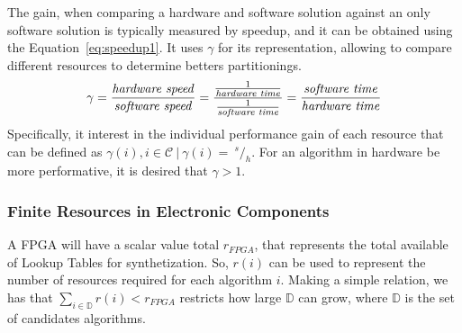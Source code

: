             
            The gain, when comparing a hardware and software solution against an only software solution is typically measured by speedup, and it can be obtained using the Equation~\ref{eq:speedup1}.
            It uses $ \gamma $ for its representation, allowing to compare different resources to determine betters partitionings.
            \begin{equation}
            \gamma =
            \frac{
            \textnormal{\textit{hardware speed}}
            }{
            \textnormal{\textit{software speed}}
            }
            =
            \frac{
            \frac{
            1
            } {
            \textnormal{\textit{hardware time}}
            }
            } {
            \frac{
            1
            }{
            \textnormal{\textit{software time}}
            }
            }
            =
            \frac{
            \textnormal{\textit{software time}}
            } {
            \textnormal{\textit{hardware time}}
            } \label{eq:speedup1}
            \end{equation}
            Specifically, it interest in the individual performance gain of each resource that can be defined as $ \gamma(i), i \in \mathcal{C}\ |\ \gamma(i) =\ ^s\!/_h $.
            For an algorithm in hardware be more performative, it is desired that $ \gamma > 1 $.
            
        
        \subsubsection{Finite Resources in Electronic Components} \label{sec:recursos}
        
            A FPGA will have a scalar value total $ r_{FPGA} $, that represents the total available of Lookup Tables for synthetization.
            So, $ r(i) $ can be used to represent the number of resources required for each algorithm $ i $.
            Making a simple relation, we has that $ \sum_{i \in \mathbb{D}} r(i) < r_{FPGA} $ restricts how large $ \mathbb{D} $ can grow, where $ \mathbb{D} $ is the set of candidates algorithms.
            
